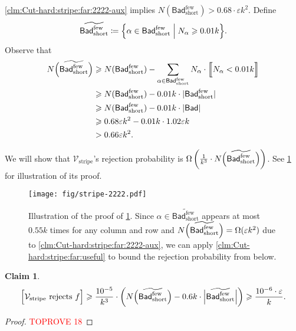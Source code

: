 \documentclass[11pt,fleqn]{article}
\renewcommand{\geq}{\geqslant}
\renewcommand{\epsilon}{\varepsilon}
\renewcommand{\tilde}{\widetilde}
\newcommand{\defeq}{\coloneq}
\newcommand{\V}{\calV}
\newcommand{\f}{f}
\newcommand{\Vstripe}{\V_\mathrm{stripe}}
\newcommand{\Bad}{\mathsf{Bad}}
\newcommand{\Badlss}{\Bad^\mathrm{few}}
\newcommand{\BadlssS}{\Badlss_\mathrm{short}}
\newcommand{\calV}{\mathcal{V}}
\let\Pr\relax\DeclareMathOperator*{\Pr}{\mathbb{P}}
\newtheorem{claim}[theorem]{Claim}
\theoremstyle{definition}
\numberwithin{equation}{section}
\begin{document}
\cref{clm:Cut-hard:stripe:far:2222-aux} implies $N(\BadlssS) > 0.68 \cdot \epsilon k^2$.
Define 
\begin{align}
    \tilde{\BadlssS} \defeq \Bigl\{
        \alpha \in \BadlssS \Bigm| N_\alpha \geq 0.01k
    \Bigr\}.
\end{align}
Observe that
\begin{align}
\begin{aligned}
    N\Bigl(\tilde{\BadlssS}\Bigr)
    & \geq N(\BadlssS) -
        \sum_{\alpha \in \BadlssS} N_\alpha \cdot \Bigl\llbracket N_\alpha < 0.01k \Bigr\rrbracket \\
    & \geq N(\BadlssS) - 0.01k \cdot |\BadlssS| \\
    & \geq N(\BadlssS) - 0.01k \cdot |\Bad| \\
    & \geq 0.68\epsilon k^2 - 0.01k \cdot 1.02\epsilon k \\
    & > 0.66 \epsilon k^2.
\end{aligned}
\end{align}


We will show that $\Vstripe$'s rejection probability is
$\Omega\left(\frac{1}{k^3}\cdot N\Bigl(\tilde{\BadlssS}\Bigr)\right)$.
See \cref{fig:Cut-hard:stripe:far:2222} for illustration of its proof.


\begin{figure}[t]
    \centering
    \texttt{[image: fig/stripe-2222.pdf]}
    \caption{
        Illustration of the proof of \cref{clm:Cut-hard:stripe:far:2222}.
        Since $\alpha \in \tilde{\BadlssS}$ appears at most $0.55k$ times for any column and row
        and $N\Bigl(\tilde{\BadlssS}\Bigr) = \Omega(\epsilon k^2)$
        due to \cref{clm:Cut-hard:stripe:far:2222-aux},
        we can apply \cref{clm:Cut-hard:stripe:far:useful} to bound
        the rejection probability from below.
    }
    \label{fig:Cut-hard:stripe:far:2222}
\end{figure}


\begin{claim}
\label{clm:Cut-hard:stripe:far:2222}
    \begin{align}
        \Pr\Bigl[ \Vstripe \text{ rejects } \f \Bigr]
        \geq \frac{10^{-5}}{k^3} \cdot \left(
            N\Bigl(\tilde{\BadlssS}\Bigr) - 0.6k \cdot \Bigl|\tilde{\BadlssS}\Bigr|
        \right)
        \geq \frac{10^{-6} \cdot \epsilon}{k}.
    \end{align}
\end{claim}
\begin{proof}\textcolor{red}{TOPROVE 18}\end{proof}
\end{document}
